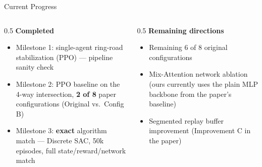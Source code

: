 \documentclass[aspectratio=169,10pt]{beamer}
\begin{document}
\begin{frame}{Current Progress}
    \begin{columns}[T]
        \begin{column}{0.5\textwidth}
            \textbf{Completed}
            \begin{itemize}
                \item Milestone 1: single-agent ring-road stabilization (PPO) --- pipeline sanity check
                \item Milestone 2: PPO baseline on the 4-way intersection, \textbf{2 of 8} paper configurations (Original vs.\ Config B)
                \item Milestone 3: \textbf{exact} algorithm match --- Discrete SAC, 50k episodes, full state/reward/network match
            \end{itemize}
        \end{column}
        \begin{column}{0.5\textwidth}
            \textbf{Remaining directions}
            \begin{itemize}
                \item Remaining 6 of 8 original configurations
                \item Mix-Attention network ablation (ours currently uses the plain MLP backbone from the paper's baseline)
                \item Segmented replay buffer improvement (Improvement C in the paper)
            \end{itemize}
        \end{column}
    \end{columns}
\end{frame}
\end{document}
